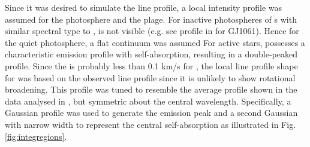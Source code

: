 Since it was desired to simulate the {\ha} line profile, a local intensity profile was assumed for the photosphere and
the plage. For inactive photospheres of \rdwarf s with similar spectral type to {\prox}, {\ha} is not visible (e.g. see
{\ha} profile in \citet[fig. 6]{barnes14} for GJ1061). Hence for the quiet photosphere, a flat continuum was assumed For
active stars, {\ha} possesses a characteristic emission profile with self-absorption, resulting in a double-peaked
profile. Since the {\vsini} is probably less than 0.1 km/s for \prox, the local line profile shape for {\ha} was based
on the observed {\prox} line profile since it is unlikely to show rotational broadening. This profile was tuned to
resemble the average {\ha} profile shown in the {\uves} data analysed in \citet{fuhrmeister11}, but symmetric about the
central wavelength. Specifically, a Gaussian profile was used to generate the emission peak and a second Gaussian with
narrow width to represent the central self-absorption as illustrated in Fig. \ref{fig:integregions}.  

